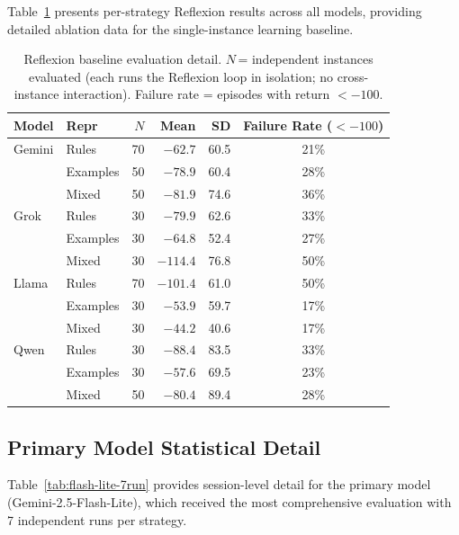 \documentclass[sigconf]{acmart}
\begin{document}
Table~\ref{tab:reflexion-detail} presents per-strategy Reflexion results across all models, providing detailed ablation data for the single-instance learning baseline.

\begin{table}[h!]
\centering
\scriptsize
\caption{Reflexion baseline evaluation detail. $N$\,= independent instances
evaluated (each runs the Reflexion loop in isolation; no cross-instance
interaction). Failure rate = episodes with return $<-100$.}
\label{tab:reflexion-detail}
\begin{tabular}{l l r r r c}
  \toprule
  \textbf{Model} & \textbf{Repr} & $N$ & \textbf{Mean} & \textbf{SD} & \textbf{Failure Rate ($<-100$)} \\
  \midrule
  Gemini & Rules & 70 & $-62.7$ & 60.5 & 21\% \\
   & Examples & 50 & $-78.9$ & 60.4 & 28\% \\
   & Mixed & 50 & $-81.9$ & 74.6 & 36\% \\
  \midrule
  Grok & Rules & 30 & $-79.9$ & 62.6 & 33\% \\
   & Examples & 30 & $-64.8$ & 52.4 & 27\% \\
   & Mixed & 30 & $-114.4$ & 76.8 & 50\% \\
  \midrule
  Llama & Rules & 70 & $-101.4$ & 61.0 & 50\% \\
   & Examples & 30 & $-53.9$ & 59.7 & 17\% \\
   & Mixed & 30 & $-44.2$ & 40.6 & 17\% \\
  \midrule
  Qwen & Rules & 30 & $-88.4$ & 83.5 & 33\% \\
   & Examples & 30 & $-57.6$ & 69.5 & 23\% \\
   & Mixed & 50 & $-80.4$ & 89.4 & 28\% \\
  \bottomrule
\end{tabular}
\end{table}

\subsection{Primary Model Statistical Detail}
\label{app:flash-lite-detail}

Table~\ref{tab:flash-lite-7run} provides session-level detail for the primary model (Gemini-2.5-Flash-Lite), which received the most comprehensive evaluation with 7 independent runs per strategy.
\end{document}
